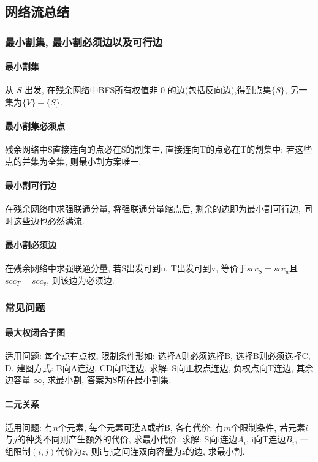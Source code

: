 \subsection{网络流总结}

\subsubsection{最小割集, 最小割必须边以及可行边}

\paragraph{最小割集} 从 $S$ 出发, 在残余网络中BFS所有权值非 $0$ 的边(包括反向边),得到点集$\{S\}$, 另一集为$\{V\} - \{S\}$. 
\paragraph{最小割集必须点} 残余网络中S直接连向的点必在S的割集中, 直接连向T的点必在T的割集中; 若这些点的并集为全集, 则最小割方案唯一.
\paragraph{最小割可行边} 在残余网络中求强联通分量, 将强联通分量缩点后, 剩余的边即为最小割可行边, 同时这些边也必然满流.
\paragraph{最小割必须边} 在残余网络中求强联通分量, 若S出发可到u, T出发可到v, 等价于$scc_S=scc_u$且$scc_T = scc_v$, 则该边为必须边.

\subsubsection{常见问题}

\paragraph{最大权闭合子图}
适用问题: 每个点有点权, 限制条件形如: 选择A则必须选择B, 选择B则必须选择C, D. 建图方式: B向A连边, CD向B连边.
求解: S向正权点连边, 负权点向T连边, 其余边容量 $\infty$, 求最小割, 答案为S所在最小割集.
\paragraph{二元关系}
适用问题: 有$n$个元素, 每个元素可选A或者B, 各有代价; 有$m$个限制条件, 若元素$i$与$j$的种类不同则产生额外的代价, 求最小代价.
求解: S向i连边$A_i$, i向T连边$B_i$, 一组限制$(i,j)$代价为$z$, 则i与j之间连双向容量为$z$的边, 求最小割.

